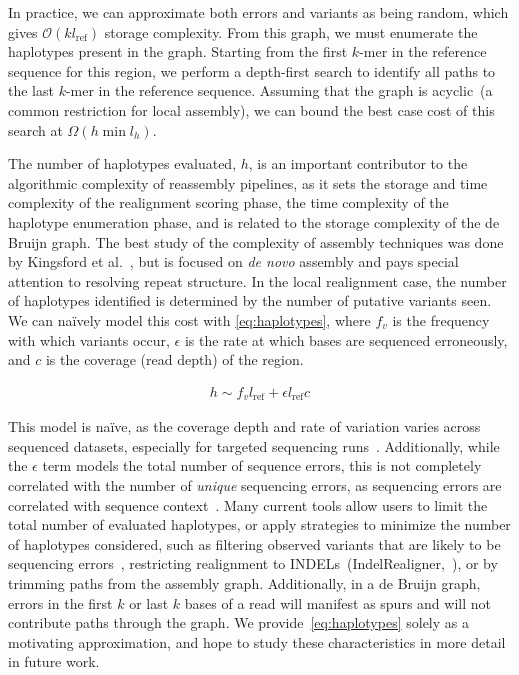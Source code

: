 \documentclass[phd]{ucbthesis}
\begin{document}
In practice, we can approximate both errors and variants as being random, which gives $\mathcal{O}(k
l_{\text{ref}})$ storage complexity. From this graph, we must enumerate the haplotypes present in the
graph. Starting from the first $k$-mer in the reference sequence for this region, we perform a depth-first
search to identify all paths to the last $k$-mer in the reference sequence. Assuming that the graph is
acyclic~(a common restriction for local assembly), we can
bound the best case cost of this search at $\Omega(h \min l_h)$.

The number of haplotypes evaluated, $h$, is an important contributor to the algorithmic complexity of
reassembly pipelines, as it sets the storage and time complexity of the realignment scoring phase, the
time complexity of the haplotype enumeration phase, and is related to the storage complexity of the
de Bruijn graph. The best study of the complexity of assembly techniques was done by Kingsford
et al.~\cite{kingsford10}, but is focused on \emph{de novo} assembly and pays special attention to
resolving repeat structure. In the local realignment case, the number of haplotypes identified is determined
by the number of putative variants seen. We can na\"{i}vely model this cost with \eqref{eq:haplotypes},
where $f_v$ is the frequency with which variants occur, $\epsilon$ is the rate at which bases are
sequenced erroneously, and $c$ is the coverage (read depth) of the region.

\begin{align}
\label{eq:haplotypes}
h \sim f_v l_{\text{ref}} + \epsilon l_{\text{ref}} c
\end{align}

This model is na\"{i}ve, as the coverage depth and rate of variation varies across sequenced datasets,
especially for targeted sequencing runs~\cite{fang14}. Additionally, while the $\epsilon$ term models the
total number of sequence errors, this is not completely correlated with the number of \emph{unique}
sequencing errors, as sequencing errors are correlated with sequence context~\cite{depristo11}. Many
current tools allow users to limit the total number of evaluated haplotypes, or apply strategies to minimize
the number of haplotypes considered, such as filtering observed variants that are likely to be sequencing
errors~\cite{garrison12}, restricting realignment to INDELs~({IndelRealigner},~\cite{depristo11}), or
by trimming paths from the assembly graph. Additionally, in a de Bruijn graph, errors in the
first $k$ or last $k$ bases of a read will manifest as spurs and will not contribute paths through the graph. We provide~\eqref{eq:haplotypes} solely as a motivating
approximation, and hope to study these characteristics in more detail in future work.
\end{document}
